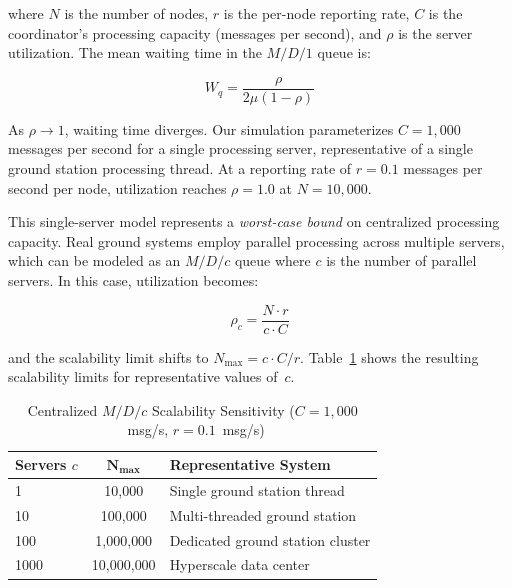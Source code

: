 \documentclass[journal]{IEEEtran}
\begin{document}
\noindent where $N$ is the number of nodes, $r$ is the per-node reporting rate, $C$ is the coordinator's processing capacity (messages per second), and $\rho$ is the server utilization. The mean waiting time in the $M/D/1$ queue is:

\begin{equation}
    W_q = \frac{\rho}{2\mu(1 - \rho)}
    \label{eq:md1_waiting}
\end{equation}

As $\rho \to 1$, waiting time diverges. Our simulation parameterizes $C = 1{,}000$ messages per second for a single processing server, representative of a single ground station processing thread. At a reporting rate of $r = 0.1$ messages per second per node, utilization reaches $\rho = 1.0$ at $N = 10{,}000$.

This single-server model represents a \emph{worst-case bound} on centralized processing capacity. Real ground systems employ parallel processing across multiple servers, which can be modeled as an $M/D/c$ queue where $c$ is the number of parallel servers. In this case, utilization becomes:

\begin{equation}
    \rho_c = \frac{N \cdot r}{c \cdot C}
    \label{eq:mdc_utilization}
\end{equation}

\noindent and the scalability limit shifts to $N_{\max} = c \cdot C / r$. Table~\ref{tab:mdc_sensitivity} shows the resulting scalability limits for representative values of~$c$.

\begin{table}[t]
    \centering
    \caption{Centralized $M/D/c$ Scalability Sensitivity ($C = 1{,}000$~msg/s, $r = 0.1$~msg/s)}
    \label{tab:mdc_sensitivity}
    \begin{tabular}{@{}lcl@{}}
        \toprule
        \textbf{Servers $c$} & $\boldsymbol{N_{\max}}$ & \textbf{Representative System} \\
        \midrule
        1    & 10{,}000      & Single ground station thread \\
        10   & 100{,}000     & Multi-threaded ground station \\
        100  & 1{,}000{,}000 & Dedicated ground station cluster \\
        1000 & 10{,}000{,}000 & Hyperscale data center \\
        \bottomrule
    \end{tabular}
\end{table}
\end{document}

